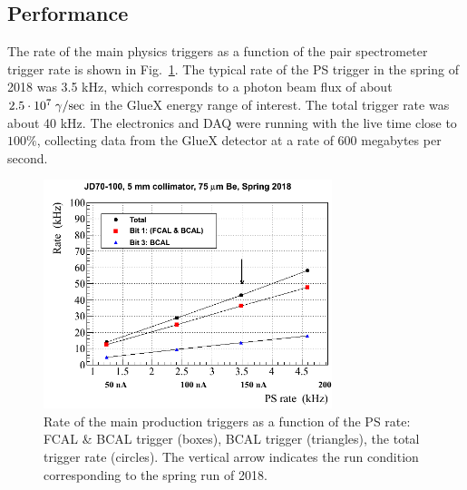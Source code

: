 \subsection{Performance \label{sec:trigperformance}}
The rate of the main physics triggers as a function of the pair 
spectrometer trigger rate is shown in Fig.~\ref{fig:trig_rate}.
The typical rate of the PS trigger in the spring of 2018 was 3.5 kHz, which corresponds to a photon beam flux of about $2.5\cdot 10^7\; \gamma/{\rm sec}$ in the GlueX energy range of interest. The total trigger rate was about 40 kHz. The electronics and DAQ were running with the live time close to 
$100 \%$, collecting data from the GlueX detector at a rate of 600 megabytes per second.


\begin{figure}[tbp]
\begin{center}
\includegraphics[width=0.75\textwidth]{figures/Rate_diamond_2018.png}  
\caption{Rate of the main production triggers as a function of the PS rate: FCAL & BCAL trigger (boxes), BCAL trigger (triangles), the total trigger rate (circles). The vertical arrow indicates the run condition corresponding to the spring run of 2018.} \label{fig:trig_rate}
\end{center}
\end{figure}
